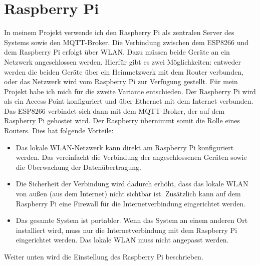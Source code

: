 \documentclass[12pt, letterpaper]{article}
\begin{document}
\section{Raspberry Pi} \label{sec:raspberry}
\par In meinem Projekt verwende ich den Raspberry Pi als zentralen Server des Systems sowie den MQTT-Broker. Die Verbindung zwischen dem ESP8266 und dem Raspberry Pi erfolgt über WLAN. Dazu müssen beide Geräte an ein Netzwerk angeschlossen werden. Hierfür gibt es zwei Möglichkeiten: entweder werden die beiden Geräte über ein Heimnetzwerk mit dem Router verbunden, oder das Netzwerk wird vom Raspberry Pi zur Verfügung gestellt. Für mein Projekt habe ich mich für die zweite Variante entschieden. Der Raspberry Pi wird als ein Access Point konfiguriert und über Ethernet mit dem Internet verbunden. Das ESP8266 verbindet sich dann mit dem MQTT-Broker, der auf dem Raspberry Pi gehostet wird. Der Raspberry übernimmt somit die Rolle eines Routers. Dies hat folgende Vorteile:
\begin{itemize}
  \item Das lokale WLAN-Netzwerk kann direkt am Raspberry Pi konfiguriert werden. Das vereinfacht die Verbindung der angeschlossenen Geräten sowie die Überwachung der Datenübertragung.
  \item Die Sicherheit der Verbindung wird dadurch erhöht, dass das lokale WLAN von außen (aus dem Internet) nicht sichtbar ist. Zusätzlich kann auf dem Raspberry Pi eine Firewall für die Internetverbindung eingerichtet werden.
  \item Das gesamte System ist portabler. Wenn das System an einem anderen Ort installiert wird, muss nur die Internetverbindung mit dem Raspberry Pi eingerichtet werden. Das lokale WLAN muss nicht angepasst werden.
\end{itemize}
\par Weiter unten wird die Einstellung des Raspberry Pi beschrieben.
\end{document}
